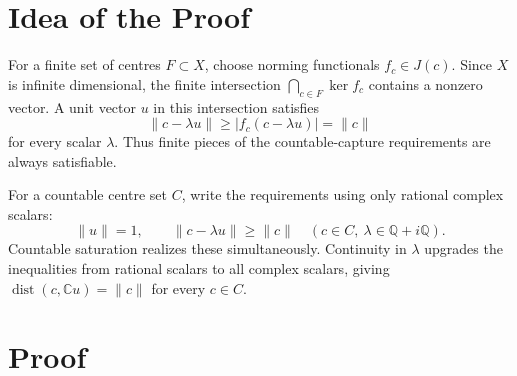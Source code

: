 \documentclass[11pt]{article}
\newcommand{\C}{\mathbb C}
\newcommand{\Q}{\mathbb Q}
\newcommand{\dist}{\operatorname{dist}}
\begin{document}
\section*{Idea of the Proof}

For a finite set of centres \(F\subset X\), choose norming functionals
\(f_c\in J(c)\).  Since \(X\) is infinite dimensional, the finite
intersection \(\bigcap_{c\in F}\ker f_c\) contains a nonzero vector.  A unit
vector \(u\) in this intersection satisfies
\[
        \|c-\lambda u\|\ge |f_c(c-\lambda u)|=\|c\|
\]
for every scalar \(\lambda\).  Thus finite pieces of the countable-capture
requirements are always satisfiable.

For a countable centre set \(C\), write the requirements using only rational
complex scalars:
\[
        \|u\|=1,\qquad
        \|c-\lambda u\|\ge \|c\|
        \quad(c\in C,\ \lambda\in\Q+i\Q).
\]
Countable saturation realizes these simultaneously.  Continuity in
\(\lambda\) upgrades the inequalities from rational scalars to all complex
scalars, giving \(\dist(c,\C u)=\|c\|\) for every \(c\in C\).

\section*{Proof}
\end{document}
